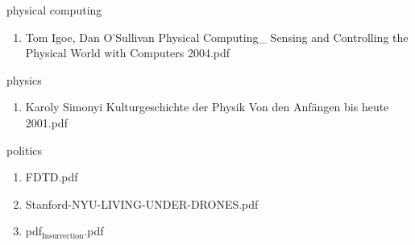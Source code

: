\documentclass[11pt]{article}
\begin{document}
\item physical computing
\label{sec-1-1-1-1-35}
\begin{enumerate}
\item Tom Igoe, Dan O'Sullivan Physical Computing\_ Sensing and Controlling the Physical World with Computers  2004.pdf
\label{sec-1-1-1-1-35-1}
\end{enumerate}

\item physics
\label{sec-1-1-1-1-36}
\begin{enumerate}
\item Karoly Simonyi Kulturgeschichte der Physik Von den Anfängen bis heute  2001.pdf
\label{sec-1-1-1-1-36-1}
\end{enumerate}

\item politics
\label{sec-1-1-1-1-37}
\begin{enumerate}
\item FDTD.pdf
\label{sec-1-1-1-1-37-1}

\item Stanford-NYU-LIVING-UNDER-DRONES.pdf
\label{sec-1-1-1-1-37-2}

\item pdf$_{\text{Insurrection}}$.pdf
\label{sec-1-1-1-1-37-3}
\end{enumerate}
\end{document}
